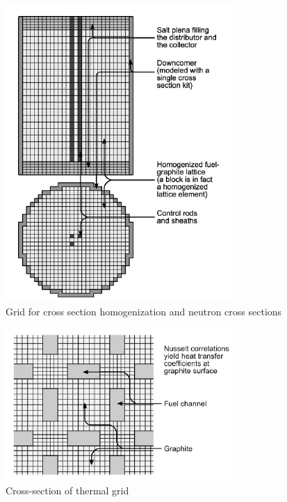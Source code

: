 \documentclass{article}
\begin{document}
\begin{figure}[htpb]
  \centering
  \includegraphics[max height=.5\textheight,max width=\textwidth,keepaspectratio]{3d-neutron-grid.png}
  \caption{Grid for cross section homogenization and neutron cross sections
    \cite{kophazi_development_2009}}
  \label{fig:neutron-grid}
\end{figure}

\begin{figure}[htpb]
  \centering
  \includegraphics[max height=.5\textheight,max width=\textwidth,keepaspectratio]{cross-section-of-thermal-grid.png}
  \caption{Cross-section of thermal grid \cite{kophazi_development_2009}}
  \label{fig:thermal-grid}
\end{figure}
\end{document}
